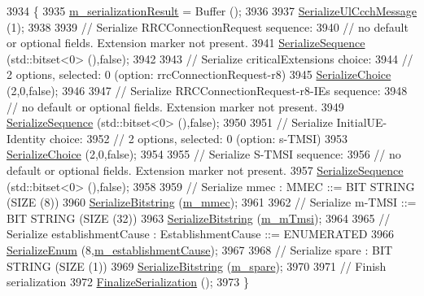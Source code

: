 \begin{DoxyCode}
3934 \{
3935   \hyperlink{classns3_1_1Asn1Header_a758b74023ea5bf40941af6f0a6a66058}{m\_serializationResult} = Buffer ();
3936 
3937   \hyperlink{classns3_1_1RrcUlCcchMessage_ac6f5ee6f826d83661b2cab01dcd78d5c}{SerializeUlCcchMessage} (1);
3938 
3939   \textcolor{comment}{// Serialize RRCConnectionRequest sequence:}
3940   \textcolor{comment}{// no default or optional fields. Extension marker not present.}
3941   \hyperlink{classns3_1_1Asn1Header_aa9744858380443ed95836fed08799aed}{SerializeSequence} (std::bitset<0> (),\textcolor{keyword}{false});
3942 
3943   \textcolor{comment}{// Serialize criticalExtensions choice:}
3944   \textcolor{comment}{// 2 options, selected: 0 (option: rrcConnectionRequest-r8)}
3945   \hyperlink{classns3_1_1Asn1Header_a400ef4a710499da80fc55e23a973d4fa}{SerializeChoice} (2,0,\textcolor{keyword}{false});
3946 
3947   \textcolor{comment}{// Serialize RRCConnectionRequest-r8-IEs sequence:}
3948   \textcolor{comment}{// no default or optional fields. Extension marker not present.}
3949   \hyperlink{classns3_1_1Asn1Header_aa9744858380443ed95836fed08799aed}{SerializeSequence} (std::bitset<0> (),\textcolor{keyword}{false});
3950 
3951   \textcolor{comment}{// Serialize InitialUE-Identity choice:}
3952   \textcolor{comment}{// 2 options, selected: 0 (option: s-TMSI)}
3953   \hyperlink{classns3_1_1Asn1Header_a400ef4a710499da80fc55e23a973d4fa}{SerializeChoice} (2,0,\textcolor{keyword}{false});
3954 
3955   \textcolor{comment}{// Serialize S-TMSI sequence:}
3956   \textcolor{comment}{// no default or optional fields. Extension marker not present.}
3957   \hyperlink{classns3_1_1Asn1Header_aa9744858380443ed95836fed08799aed}{SerializeSequence} (std::bitset<0> (),\textcolor{keyword}{false});
3958 
3959   \textcolor{comment}{// Serialize mmec : MMEC ::= BIT STRING (SIZE (8))}
3960   \hyperlink{classns3_1_1Asn1Header_a0be8d507b87be07f85f35b906f8e5da7}{SerializeBitstring} (\hyperlink{classns3_1_1RrcConnectionRequestHeader_abab1a31ce6a91e3d27bc67b0669ad204}{m\_mmec});
3961 
3962   \textcolor{comment}{// Serialize m-TMSI ::= BIT STRING (SIZE (32))}
3963   \hyperlink{classns3_1_1Asn1Header_a0be8d507b87be07f85f35b906f8e5da7}{SerializeBitstring} (\hyperlink{classns3_1_1RrcConnectionRequestHeader_acbd02a83e227f832fe6c0143d74737e3}{m\_mTmsi});
3964 
3965   \textcolor{comment}{// Serialize establishmentCause : EstablishmentCause ::= ENUMERATED}
3966   \hyperlink{classns3_1_1Asn1Header_ac8e56956823ab8e4470c09e162e7bf24}{SerializeEnum} (8,\hyperlink{classns3_1_1RrcConnectionRequestHeader_a387b8ec9e546670a37de6c841b4d3981}{m\_establishmentCause});
3967 
3968   \textcolor{comment}{// Serialize spare : BIT STRING (SIZE (1))}
3969   \hyperlink{classns3_1_1Asn1Header_a0be8d507b87be07f85f35b906f8e5da7}{SerializeBitstring} (\hyperlink{classns3_1_1RrcConnectionRequestHeader_a717284d392b79a8344d76bb526e7f6fc}{m\_spare});
3970 
3971   \textcolor{comment}{// Finish serialization}
3972   \hyperlink{classns3_1_1Asn1Header_a6c9bfaa54e5ca1a4eb8ea6c6b5550a8b}{FinalizeSerialization} ();
3973 \}
\end{DoxyCode}


